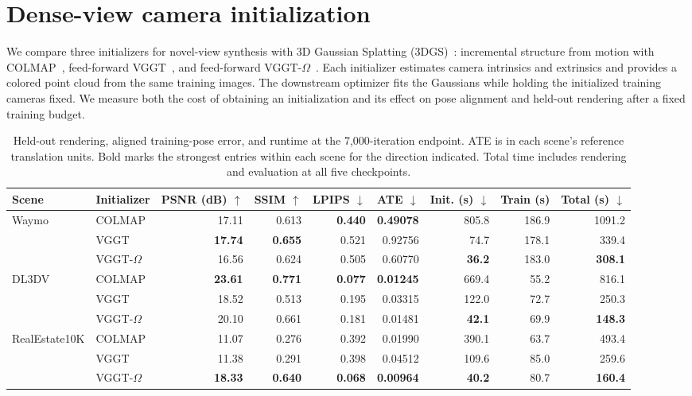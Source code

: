 \section{Dense-view camera initialization}
\label{sec:part1}

We compare three initializers for novel-view synthesis with 3D Gaussian Splatting (3DGS)~\cite{kerbl2023gaussians}: incremental structure from motion with COLMAP~\cite{schonberger2016sfm}, feed-forward VGGT~\cite{wang2025vggt}, and feed-forward VGGT-$\Omega$~\cite{wang2026vggtomega}. Each initializer estimates camera intrinsics and extrinsics and provides a colored point cloud from the same training images. The downstream optimizer fits the Gaussians while holding the initialized training cameras fixed. We measure both the cost of obtaining an initialization and its effect on pose alignment and held-out rendering after a fixed training budget.

\begin{table}[t]
  \centering
  \small
  \begin{tabular}{llrrrrrrr}
    \toprule
    Scene & Initializer & PSNR (dB) $\uparrow$ & SSIM $\uparrow$ & LPIPS $\downarrow$ &
    ATE $\downarrow$ & Init. (s) $\downarrow$ & Train (s) & Total (s) $\downarrow$ \\
    \midrule
    Waymo & COLMAP & 17.11 & 0.613 & \textbf{0.440} & \textbf{0.49078} & 805.8 & 186.9 & 1091.2 \\
          & VGGT & \textbf{17.74} & \textbf{0.655} & 0.521 & 0.92756 & 74.7 & 178.1 & 339.4 \\
          & VGGT-$\Omega$ & 16.56 & 0.624 & 0.505 & 0.60770 & \textbf{36.2} & 183.0 & \textbf{308.1} \\
    \midrule
    DL3DV & COLMAP & \textbf{23.61} & \textbf{0.771} & \textbf{0.077} & \textbf{0.01245} & 669.4 & 55.2 & 816.1 \\
          & VGGT & 18.52 & 0.513 & 0.195 & 0.03315 & 122.0 & 72.7 & 250.3 \\
          & VGGT-$\Omega$ & 20.10 & 0.661 & 0.181 & 0.01481 & \textbf{42.1} & 69.9 & \textbf{148.3} \\
    \midrule
    RealEstate10K & COLMAP & 11.07 & 0.276 & 0.392 & 0.01990 & 390.1 & 63.7 & 493.4 \\
                  & VGGT & 11.38 & 0.291 & 0.398 & 0.04512 & 109.6 & 85.0 & 259.6 \\
                  & VGGT-$\Omega$ & \textbf{18.33} & \textbf{0.640} & \textbf{0.068} & \textbf{0.00964} & \textbf{40.2} & 80.7 & \textbf{160.4} \\
    \bottomrule
  \end{tabular}
  \caption{Held-out rendering, aligned training-pose error, and runtime at the 7,000-iteration endpoint. ATE is in each scene's reference translation units. Bold marks the strongest entries within each scene for the direction indicated. Total time includes rendering and evaluation at all five checkpoints.}
  \label{tab:part1_main}
\end{table}

